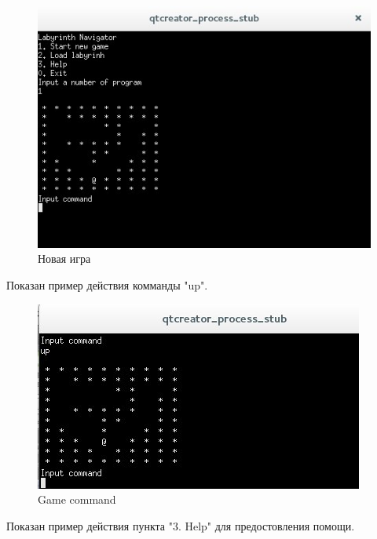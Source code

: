 \documentclass[a4paper]{article}
\begin{document}
\begin{figure}[H]
	\begin{center}
		\includegraphics[scale=0.7]{Screenshot/3.jpg}
		\caption{Новая игра} 
		\label{pic:pic_name} %
	\end{center}
\end{figure}

Показан пример действия комманды "up".

\begin{figure}[H]
	\begin{center}
		\includegraphics[scale=0.7]{Screenshot/4.jpg}
		\caption{Game command} 
		\label{pic:pic_name} %
	\end{center}
\end{figure}

Показан пример действия пункта "3. Help" для предостовления помощи.
\end{document}
